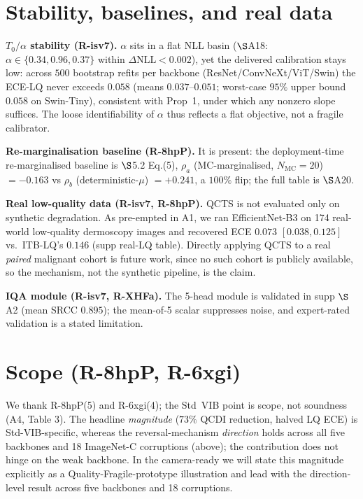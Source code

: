 \documentclass[10pt,twocolumn,letterpaper]{article}
\begin{document}
\section{Stability, baselines, and real data}
\noindent\textbf{$T_0/\alpha$ stability (R-isv7).} $\alpha$ sits in a flat NLL basin ($\S$A18: $\alpha\in\{0.34,0.96,0.37\}$ within $\Delta\mathrm{NLL}<0.002$), yet the delivered calibration stays low: across $500$ bootstrap refits per backbone (ResNet/ConvNeXt/ViT/Swin) the ECE-LQ never exceeds $0.058$ (means $0.037$--$0.051$; worst-case $95\%$ upper bound $0.058$ on Swin-Tiny), consistent with Prop~1, under which any nonzero slope suffices. The loose identifiability of $\alpha$ thus reflects a flat objective, not a fragile calibrator.

\noindent\textbf{Re-marginalisation baseline (R-8hpP).} It is present: the deployment-time re-marginalised baseline is $\S$5.2 Eq.(5), $\rho_a$ (MC-marginalised, $N_{\mathrm{MC}}{=}20$) $=-0.163$ vs $\rho_b$ (deterministic-$\mu$) $=+0.241$, a $100\%$ flip; the full table is $\S$A20.

\noindent\textbf{Real low-quality data (R-isv7, R-8hpP).} QCTS is not evaluated only on synthetic degradation. As pre-empted in A1, we ran EfficientNet-B3 on 174 real-world low-quality dermoscopy images and recovered ECE $0.073$ $[0.038,0.125]$ vs.\ ITB-LQ's $0.146$ (supp real-LQ table). Directly applying QCTS to a real \emph{paired} malignant cohort is future work, since no such cohort is publicly available, so the mechanism, not the synthetic pipeline, is the claim.

\noindent\textbf{IQA module (R-isv7, R-XHFa).} The 5-head module is validated in supp $\S$A2 (mean SRCC $0.895$); the mean-of-5 scalar suppresses noise, and expert-rated validation is a stated limitation.

\section{Scope (R-8hpP, R-6xgi)}
We thank R-8hpP(5) and R-6xgi(4); the Std~VIB point is scope, not soundness (A4, Table 3). The headline \emph{magnitude} ($73\%$ QCDI reduction, halved LQ ECE) is Std-VIB-specific, whereas the reversal-mechanism \emph{direction} holds across all five backbones and 18 ImageNet-C corruptions (above); the contribution does not hinge on the weak backbone. In the camera-ready we will state this magnitude explicitly as a Quality-Fragile-prototype illustration and lead with the direction-level result across five backbones and 18 corruptions.
\end{document}
